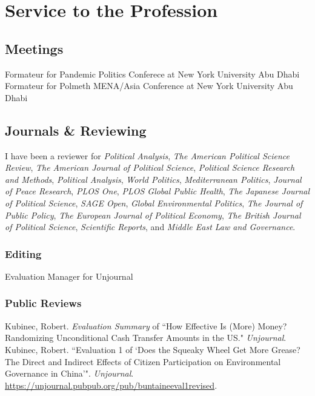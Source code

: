 \documentclass[11pt, a4paper]{article}
\newcommand{\years}[1]{\marginnote{\scriptsize #1}}
\begin{document}
\section*{Service to the Profession}

\subsection*{Meetings}

\years{2023}Formateur for Pandemic Politics Conferece at New York University Abu Dhabi\\
\years{2024}Formateur for Polmeth MENA/Asia Conference at New York University Abu Dhabi 

\subsection*{Journals \& Reviewing}

I have been a reviewer for \emph{Political Analysis}, \emph{The American Political Science Review}, \emph{The American Journal of Political Science}, \emph{Political Science Research and Methods}, \emph{Political Analysis}, \emph{World Politics}, \emph{Mediterranean Politics}, \emph{Journal of Peace Research}, \emph{PLOS One}, \emph{PLOS Global Public Health}, \emph{The Japanese Journal of Political Science}, \emph{SAGE Open}, \emph{Global Environmental Politics}, \emph{The Journal of Public Policy}, \emph{The European Journal of Political Economy}, \emph{The British Journal of Political Science}, \emph{Scientific Reports}, and \emph{Middle East Law and Governance}.\\

\subsubsection*{Editing}

\years{2023-2025} Evaluation Manager for Unjournal

\subsubsection*{Public Reviews}

\years{2024}Kubinec, Robert. \emph{Evaluation Summary} of ``How Effective Is (More) Money? Randomizing Unconditional Cash Transfer Amounts in the US." \emph{Unjournal}. \\

\years{2023}Kubinec, Robert. ``Evaluation 1 of `Does the Squeaky Wheel Get More Grease? The Direct and Indirect Effects of Citizen Participation on Environmental Governance in China'". \emph{Unjournal}. \url{https://unjournal.pubpub.org/pub/buntaineeval1revised}.
\end{document}
